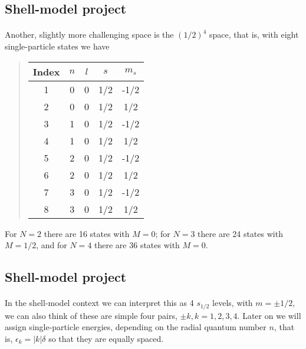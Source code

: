 \subsection*{Shell-model project}

\paragraph{}
Another, slightly more challenging space is the $(1/2)^4$ space, that is, 
with eight  single-particle states we have


\begin{quote}
\begin{tabular}{ccccc}
\hline
\multicolumn{1}{c}{ Index } & \multicolumn{1}{c}{ $n$ } & \multicolumn{1}{c}{ $l$ } & \multicolumn{1}{c}{ $s$ } & \multicolumn{1}{c}{ $m_s$ } \\
\hline
1     & 0   & 0   & 1/2 & -1/2  \\
2     & 0   & 0   & 1/2 & 1/2   \\
3     & 1   & 0   & 1/2 & -1/2  \\
4     & 1   & 0   & 1/2 & 1/2   \\
5     & 2   & 0   & 1/2 & -1/2  \\
6     & 2   & 0   & 1/2 & 1/2   \\
7     & 3   & 0   & 1/2 & -1/2  \\
8     & 3   & 0   & 1/2 & 1/2   \\
\hline
\end{tabular}
\end{quote}

\noindent
For $N=2$ there are 16 states with $M=0$; for $N=3$ there are 24 states with $M=1/2$, and for 
$N=4$ there are 36 states with $M=0$.



\subsection*{Shell-model project}

\paragraph{}
In the shell-model context we can interpret this as 4 $s_{1/2}$ levels, with $m = \pm 1/2$, we can also think of these are simple four pairs,  $\pm k, k = 1,2,3,4$. Later on we will 
assign single-particle energies,  depending on the radial quantum number $n$, that is, 
$\epsilon_k = |k| \delta$ so that they are equally spaced.



